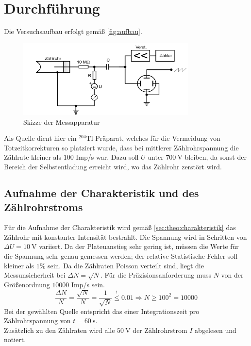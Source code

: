 \section{Durchführung}
\label{sec:Durchführung}

Die Versuchsaufbau erfolgt gemäß \autoref{fig:aufbau}.
\begin{figure}[H]
	\centering
	\includegraphics[width=0.8\textwidth]{content/aufbau.png}
	\caption{Skizze der Messapparatur \cite{sample}}
	\label{fig:aufbau}
\end{figure}

\noindent
Als Quelle dient hier ein $^{204}\text{Tl}$-Präparat, welches für die Vermeidung von Totzeitkorrekturen so platziert 
wurde, dass bei mittlerer Zählrohrspannung die Zählrate kleiner als $100$ Imp/s war. Dazu soll $U$ unter $\SI{700}{\volt}$
bleiben, da sonst der Bereich der Selbstentladung erreicht wird, wo das Zählrohr zerstört wird.

\subsection{Aufnahme der Charakteristik und des Zählrohrstroms}
\label{sec:durch:charakteristik}

Für die Aufnahme der Charakteristik wird gemäß \autoref{sec:theo:charakteristik} das Zählrohr mit konstanter 
Intensität bestrahlt. Die Spannung wird in Schritten von $\Delta U = \SI{10}{\volt}$ variiert. Da der Plateuanstieg
sehr gering ist, müssen die Werte für die Spannung sehr genau gemessen werden; der relative Statistische Fehler soll
kleiner als $1\%$ sein. Da die Zählraten Poisson verteilt sind, liegt die Messunsicherheit bei $\Delta N = \sqrt{N}$.
Für die Präzisionsanforderung muss $N$ von der Größenordnung $10000$ Imp/s sein.
\begin{equation}
	\frac{\Delta N}{N} = \frac{\sqrt{N}}{N} = \frac{1}{\sqrt{N}} \overset{!}{\leq} 0.01 
	\Rightarrow N \geq 100^2 = 10000
\end{equation}
\noindent
Bei der gewählten Quelle entspricht das einer Integrationszeit pro Zählrohrspannung von $t = \SI{60}{\second}$.
\\
Zusätzlich zu den Zählraten wird alle $\SI{50}{\volt}$ der Zählrohrstrom $I$ abgelesen und notiert.

